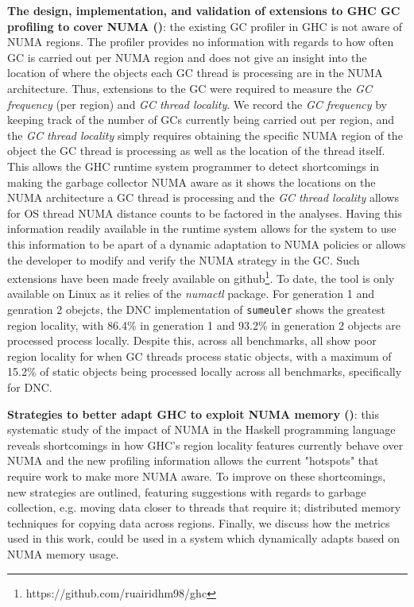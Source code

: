 \documentclass{paper}\usepackage{graphicx}
\begin{document}
\textbf{The design, implementation, and validation of extensions to GHC GC profiling to cover NUMA ()}: the existing GC profiler in GHC is not aware of NUMA regions. The profiler provides no information with regards to how often GC is carried out per NUMA region and does not give an insight into the location of where the objects each GC thread is processing are in the NUMA architecture. Thus, extensions to the GC were required to measure the \textit{GC frequency} (per region) and \textit{GC thread locality}. We record the \textit{GC frequency} by keeping track of the number of GCs currently being carried out per region, and the \textit{GC thread locality} simply requires obtaining the specific NUMA region of the object the GC thread is processing as well as the location of the thread itself. This allows the GHC runtime system programmer to detect shortcomings in making the garbage collector NUMA aware as it shows the locations on the NUMA architecture a GC thread is processing and the \textit{GC thread locality} allows for OS thread NUMA distance counts to be factored in the analyses. Having this information readily available in the runtime system allows for the system to use this information to be apart of a dynamic adaptation to NUMA policies or allows the developer to modify and verify the NUMA strategy in the GC. Such extensions have been made freely available on github\footnote{https://github.com/ruairidhm98/ghc}. To date, the tool is only available on Linux as it relies of the \textit{numactl} package. For generation 1 and genration 2 obejcts, the DNC implementation of \lstinline{sumeuler} shows the greatest region locality, with 86.4\% in generation 1 and 93.2\% in generation 2 objects are processed process locally. Despite this, across all benchmarks, all show poor region locality for when GC threads process static objects, with a maximum of 15.2\% of static objects being processed locally across all benchmarks, specifically for DNC.

\textbf{Strategies to better adapt GHC to exploit NUMA memory ()}: this systematic study of the impact of NUMA in the Haskell programming language reveals shortcomings in how GHC's region locality features currently behave over NUMA and the new profiling information allows the current "hotspots" that require work to make more NUMA aware. To improve on these shortcomings, new strategies are outlined, featuring suggestions with regards to garbage collection, e.g. moving data closer to threads that require it; distributed memory techniques for copying data across regions. Finally, we discuss how the metrics used in this work, could be used in a system which dynamically adapts based on NUMA memory usage.
\end{document}
